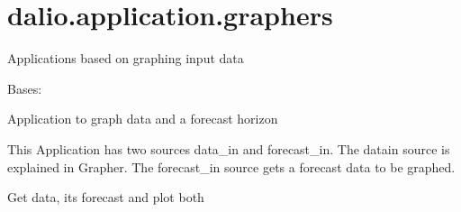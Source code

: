 \documentclass[letterpaper,10pt,english]{sphinxmanual}
\begin{document}
\section{dalio.application.graphers}
\label{\detokenize{dalio.application:module-dalio.application.graphers}}\label{\detokenize{dalio.application:dalio-application-graphers}}
Applications based on graphing input data

\begin{fulllineitems}
\label{\detokenize{dalio.application:dalio.application.graphers.ForecastGrapher}}
Bases: {\hyperref[\detokenize{dalio.application:dalio.application.graphers.Grapher}]{}}

Application to graph data and a forecast horizon

This Application has two sources data\_in and forecast\_in. The data\sphinxhyphen{}in
source is explained in Grapher. The forecast\_in source gets a forecast
data to be graphed.

\begin{fulllineitems}
\label{\detokenize{dalio.application:dalio.application.graphers.ForecastGrapher.run}}
Get data, its forecast and plot both

\end{fulllineitems}


\end{fulllineitems}

\end{document}
